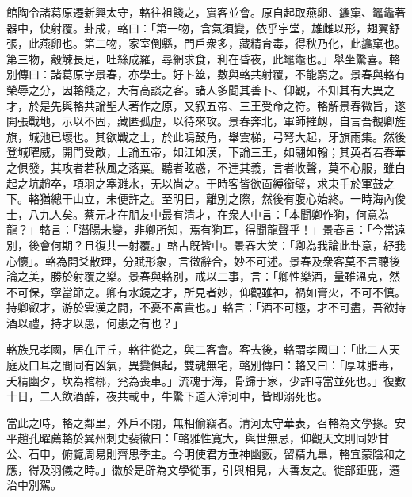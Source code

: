 \begin{pinyinscope}
館陶令諸葛原遷新興太守，輅往祖餞之，賔客並會。原自起取燕卵、蠭窠、䵹鼄著器中，使射覆。卦成，輅曰：「第一物，含氣須變，依乎宇堂，雄雌以形，翅翼舒張，此燕卵也。第二物，家室倒縣，門戶衆多，藏精育毒，得秋乃化，此蠭窠也。第三物，觳觫長足，吐絲成羅，尋網求食，利在昏夜，此䵹鼄也。」舉坐驚喜。輅別傳曰：諸葛原字景春，亦學士。好卜筮，數與輅共射覆，不能窮之。景春與輅有榮辱之分，因輅餞之，大有高談之客。諸人多聞其善卜、仰觀，不知其有大異之才，於是先與輅共論聖人著作之原，又叙五帝、三王受命之符。輅解景春微旨，遂開張戰地，示以不固，藏匿孤虛，以待來攻。景春奔北，軍師摧衂，自言吾覩卿旌旗，城池已壞也。其欲戰之士，於此鳴鼓角，舉雲梯，弓弩大起，牙旗雨集。然後登城曜威，開門受敵，上論五帝，如江如漢，下論三王，如翮如翰；其英者若春華之俱發，其攻者若秋風之落葉。聽者眩惑，不達其義，言者收聲，莫不心服，雖白起之坑趙卒，項羽之塞濉水，无以尚之。于時客皆欲靣縛銜璧，求束手於軍鼓之下。輅猶總干山立，未便許之。至明日，離別之際，然後有腹心始終。一時海內俊士，八九人矣。蔡元才在朋友中最有清才，在衆人中言：「本聞卿作狗，何意為龍？」輅言：「潛陽未變，非卿所知，焉有狗耳，得聞龍聲乎！」景春言：「今當遠別，後會何期？且復共一射覆。」輅占旣皆中。景春大笑：「卿為我論此卦意，紓我心懷」。輅為開爻散理，分賦形象，言徵辭合，妙不可述。景春及衆客莫不言聽後論之美，勝於射覆之樂。景春與輅別，戒以二事，言：「卿性樂酒，量雖溫克，然不可保，寧當節之。卿有水鏡之才，所見者妙，仰觀雖神，禍如膏火，不可不慎。持卿叡才，游於雲漢之間，不憂不富貴也。」輅言：「酒不可極，才不可盡，吾欲持酒以禮，持才以愚，何患之有也？」

輅族兄孝國，居在厈丘，輅往從之，與二客會。客去後，輅謂孝國曰：「此二人天庭及口耳之間同有凶氣，異變俱起，雙魂無宅，輅別傳曰：輅又曰：「厚味腊毒，夭精幽夕，坎為棺槨，兊為喪車。」流魂于海，骨歸于家，少許時當並死也。」復數十日，二人飲酒醉，夜共載車，牛驚下道入漳河中，皆即溺死也。

當此之時，輅之鄰里，外戶不閉，無相偷竊者。清河太守華表，召輅為文學掾。安平趙孔曜薦輅於兾州刺史裴徽曰：「輅雅性寬大，與世無忌，仰觀天文則同妙甘公、石申，俯覽周易則齊思季主。今明使君方垂神幽藪，留精九臯，輅宜蒙陰和之應，得及羽儀之時。」徽於是辟為文學從事，引與相見，大善友之。徙部鉅鹿，遷治中別駕。


\end{pinyinscope}
